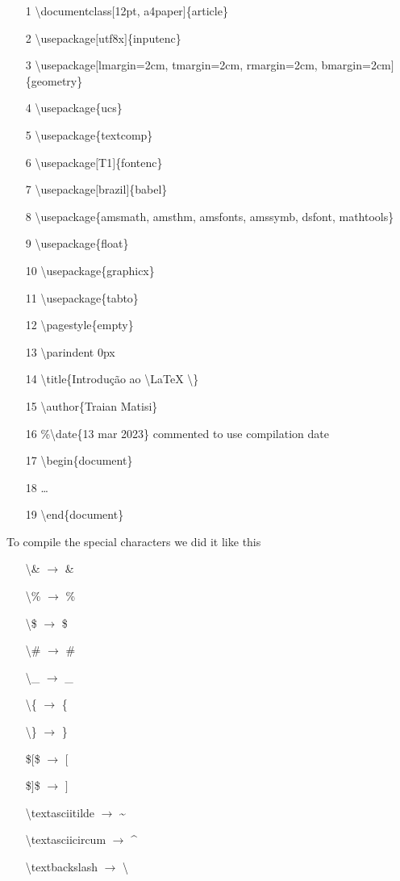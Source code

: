 \documentclass[12pt, a4paper]{article}
\begin{document}
\begin{itemize}
    \item[1]\textbackslash documentclass$[$12pt, a4paper$]$\{article\}
    \item[2]\textbackslash usepackage$[$utf8x$]$\{inputenc\}
    \item[3]\textbackslash usepackage$[$lmargin=2cm, tmargin=2cm, rmargin=2cm, bmargin=2cm$]$\{geometry\}
    \item[4]\textbackslash usepackage\{ucs\}
    \item[5]\textbackslash usepackage\{textcomp\}
    \item[6]\textbackslash usepackage$[$T1$]$\{fontenc\}
    \item[7]\textbackslash usepackage$[$brazil$]$\{babel\}
    \item[8]\textbackslash usepackage\{amsmath, amsthm, amsfonts, amssymb, dsfont, mathtools\}
    \item[9]\textbackslash usepackage\{float\}
    \item[10]\textbackslash usepackage\{graphicx\}
    \item[11]\textbackslash usepackage\{tabto\}
    \item[12]\textbackslash pagestyle\{empty\}
    \item[13]\textbackslash parindent 0px
    \item[14]\textbackslash title\{Introdução ao \textbackslash LaTeX \textbackslash\}
    \item[15]\textbackslash author\{Traian Matisi\}
    \item[16]\%\textbackslash date\{13 mar 2023\} commented to use compilation date
    \item[17]\textbackslash begin\{document\}
    \item[18]\ldots
    \item[19]\textbackslash end\{document\}
\end{itemize}

To compile the special characters we did it like this
\begin{itemize}
    \item[]\textbackslash \& $\rightarrow$ \&
    \item[]\textbackslash \% $\rightarrow$ \%
    \item[]\textbackslash \$ $\rightarrow$ \$
    \item[]\textbackslash \# $\rightarrow$ \#
    \item[]\textbackslash \_ $\rightarrow$ \_
    \item[]\textbackslash \{ $\rightarrow$ \{
    \item[]\textbackslash \} $\rightarrow$ \}
    \item[]\$$[$\$ $\rightarrow$ $[$
    \item[]\$$]$\$ $\rightarrow$ $]$
    \item[]\textbackslash textasciitilde $\rightarrow$ \textasciitilde
    \item[]\textbackslash textasciicircum $\rightarrow$ \textasciicircum
    \item[]\textbackslash textbackslash $\rightarrow$ \textbackslash
\end{itemize}
\end{document}
